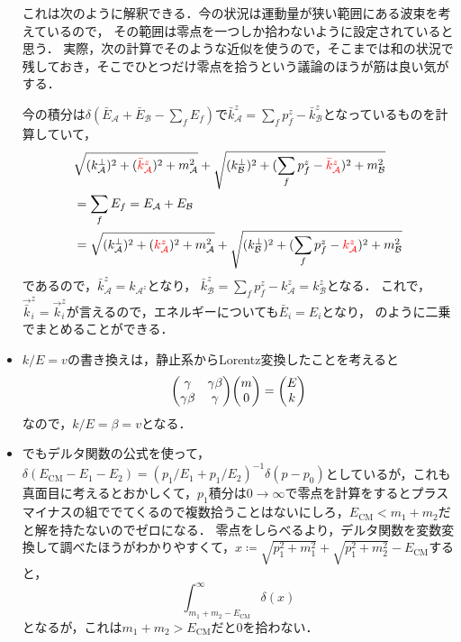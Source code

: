 \begin{itemize}
		これは次のように解釈できる．今の状況は運動量が狭い範囲にある波束を考えているので，
		その範囲は零点を一つしか拾わないように設定されていると思う．
		実際，次の計算でそのような近似を使うので，そこまでは和の状況で残しておき，そこでひとつだけ零点を拾うという議論のほうが筋は良い気がする．

		今の積分は$\delta(\bar{E}_{\mathcal{A}} + \bar{E}_{\mathcal{B}}-\sum_fE_f)$で$\bar{k}_{\mathcal{A}}^z = \sum_fp_f^z - \bar{k}_{\mathcal{B}}^z$となっているものを計算していて，
		\begin{align}
			&\sqrt{(k_{\mathcal{A}}^{\perp})^2+(\textcolor{red}{\bar{k}_{\mathcal{A}}^z})^2+m_{\mathcal{A}}^2} + \sqrt{(k_{\mathcal{B}}^{\perp})^2 + (\sum_fp_f^z-\textcolor{red}{\bar{k}_{\mathcal{A}}^z})^2+m_{\mathcal{B}}^2}\\
			& = \sum_fE_f = E_{\mathcal{A}} + E_{\mathcal{B}}\\
			& = \sqrt{(k_{\mathcal{A}}^{\perp})^2+(\textcolor{red}{k_{\mathcal{A}}^z})^2+m_{\mathcal{A}}^2} + \sqrt{(k_{\mathcal{B}}^{\perp})^2 + (\sum_fp_f^z-\textcolor{red}{k_{\mathcal{A}}^z})^2+m_{\mathcal{B}}^2}
		\end{align}
		であるので，$\bar{k}_{\mathcal{A}}^z = k_{\mathcal{A}^z}$となり，
		$\bar{k}_{\mathcal{B}}^z = \sum_fp_f^z-k_{\mathcal{A}}^z = k_{\mathcal{B}}^z$となる．
		これで，$\vec{\bar{k}}_{i}^z = \vec{k}_i^z$が言えるので，エネルギーについても$\bar{E}_i=E_i$となり，
		のように二乗でまとめることができる．
	\item $k/E = v$の書き換えは，静止系からLorentz変換したことを考えると
		\begin{equation}
			\mqty(\gamma & \gamma\beta\\ \gamma\beta & \gamma)\mqty(m\\0) = \mqty(E\\k)
		\end{equation}
		なので，$k/E = \beta = v$となる．

	\item {}でもデルタ関数の公式を使って，$\delta(E_{\text{CM}}-E_1-E_2)=(p_1/E_1 + p_1/E_2)^{-1}\delta(p-p_0)$としているが，これも真面目に考えるとおかしくて，$p_1$積分は$0\to \infty$で零点を計算をするとプラスマイナスの組ででてくるので複数拾うことはないにしろ，$E_{\text{CM}} < m_1+m_2$だと解を持たないのでゼロになる．
		零点をしらべるより，デルタ関数を変数変換して調べたほうがわかりやすくて\cite{Schwartz:2014sze}，$x\coloneqq \sqrt{p_1^2+m_1^2} + \sqrt{p_1^2 + m_2^2} - E_{\text{CM}}$すると，
		\begin{equation}
		\int_{m_1+m_2-E_{\text{CM}}}^{\infty}\delta(x)
		\end{equation}
		となるが，これは$m_1+m_2 > E_{\text{CM}}$だと$0$を拾わない．
		

\end{itemize}
